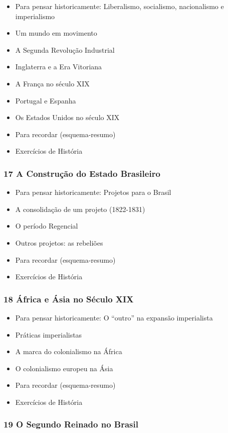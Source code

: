 \documentclass[a4paper,12pt]{article}[abntex2]
\begin{document}
\begin{itemize}
\item Para pensar historicamente: Liberalismo, socialismo, nacionalismo e imperialismo
\item Um mundo em movimento
\item A Segunda Revolução Industrial
\item Inglaterra e a Era Vitoriana
\item A França no século XIX
\item Portugal e Espanha
\item Os Estados Unidos no século XIX
\item Para recordar (esquema-resumo)
\item Exercícios de História
\end{itemize}
\subsubsection*{17 A Construção do Estado Brasileiro}

\begin{itemize}
\item Para pensar historicamente: Projetos para o Brasil
\item A consolidação de um projeto (1822-1831)
\item O período Regencial
\item Outros projetos: as rebeliões
\item Para recordar (esquema-resumo)
\item Exercícios de História
\end{itemize}
\subsubsection*{18 África e Ásia no Século XIX}

\begin{itemize}
\item Para pensar historicamente: O “outro” na expansão imperialista
\item Práticas imperialistas
\item A marca do colonialismo na África
\item O colonialismo europeu na Ásia
\item Para recordar (esquema-resumo)
\item Exercícios de História
\end{itemize}
\subsubsection*{19 O Segundo Reinado no Brasil}
\end{document}

